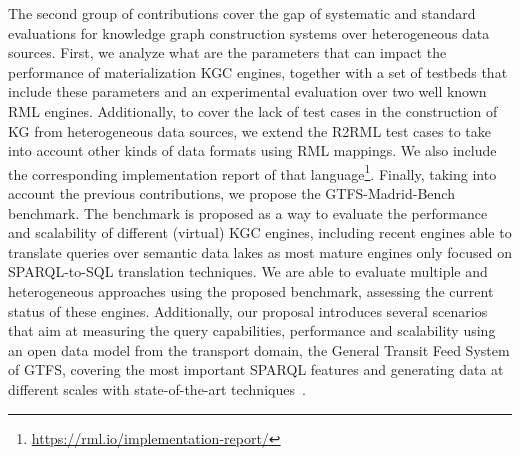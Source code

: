 The second group of contributions cover the gap of systematic and standard evaluations for knowledge graph construction systems over heterogeneous data sources. First, we analyze what are the parameters that can impact the performance of materialization KGC engines, together with a set of testbeds that include these parameters and an experimental evaluation over two well known RML engines. Additionally, to cover the lack of test cases in the construction of KG from heterogeneous data sources, we extend the R2RML test cases to take into account other kinds of data formats using RML mappings. We also include the corresponding implementation report of that language\footnote{\url{https://rml.io/implementation-report/}}. Finally, taking into account the previous contributions, we propose the GTFS-Madrid-Bench benchmark. The benchmark is proposed as a way to evaluate the performance and scalability of different (virtual) KGC engines, including recent engines able to translate queries over semantic data lakes as most mature engines only focused on SPARQL-to-SQL translation techniques. We are able to evaluate multiple and heterogeneous approaches using the proposed benchmark, assessing the current status of these engines. Additionally, our proposal introduces several scenarios that aim at measuring the query capabilities, performance and scalability using an open data model from the transport domain, the General Transit Feed System of GTFS, covering the most important SPARQL features and generating data at different scales with state-of-the-art techniques~\citep{lantivig}. 



